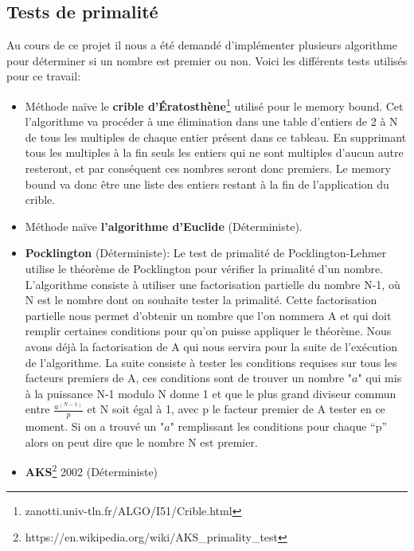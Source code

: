 		\subsection{Tests de primalité}
		Au cours de ce projet il nous a été demandé d'implémenter plusieurs algorithme pour déterminer si un nombre est premier ou non. Voici les différents tests utilisés pour ce travail:
		\begin{itemize}
			\item Méthode naïve le \textbf{crible d’Ératosthène}\footnote{zanotti.univ-tln.fr/ALGO/I51/Crible.html} utilisé pour le memory bound. Cet l'algorithme va procéder à une élimination dans une table d'entiers de 2 à N de tous les multiples de chaque entier présent dans ce tableau. En supprimant tous les multiples à la fin seuls les entiers qui ne sont multiples d'aucun autre resteront, et par conséquent ces nombres seront donc premiers. Le memory bound va donc être une liste des entiers restant à la fin de l'application du crible.\\
			
			\item Méthode naïve \textbf{l'algorithme d'Euclide} (Déterministe).\\
			
			\item \textbf{Pocklington} (Déterministe): Le test de primalité de Pocklington-Lehmer utilise le théorème de Pocklington pour vérifier la primalité d’un nombre.
L’algorithme consiste à utiliser une factorisation partielle du nombre N-1, où N est le nombre dont on souhaite tester la primalité. Cette factorisation partielle nous permet d’obtenir un nombre que l’on nommera A et qui doit remplir certaines conditions pour qu’on puisse appliquer le théorème.
Nous avons déjà la factorisation de A qui nous servira pour la suite de l'exécution de l’algorithme. 
La suite consiste à tester les conditions requises sur tous les facteurs premiers de A, ces conditions sont de trouver un nombre "$a$" qui mis à la puissance N-1 modulo N donne 1 et que le plus grand diviseur commun entre {\Large$\frac{a^{(N-1)}}{p}$} et N soit égal à 1, avec p le facteur premier de A tester en ce moment. Si on a trouvé un "$a$" remplissant les conditions pour chaque “p” alors on peut dire que le nombre N est premier.\\

			\item \textbf{AKS}\footnote{https://en.wikipedia.org/wiki/AKS\_primality\_test} 2002 (Déterministe)\\
			

\end{itemize}
